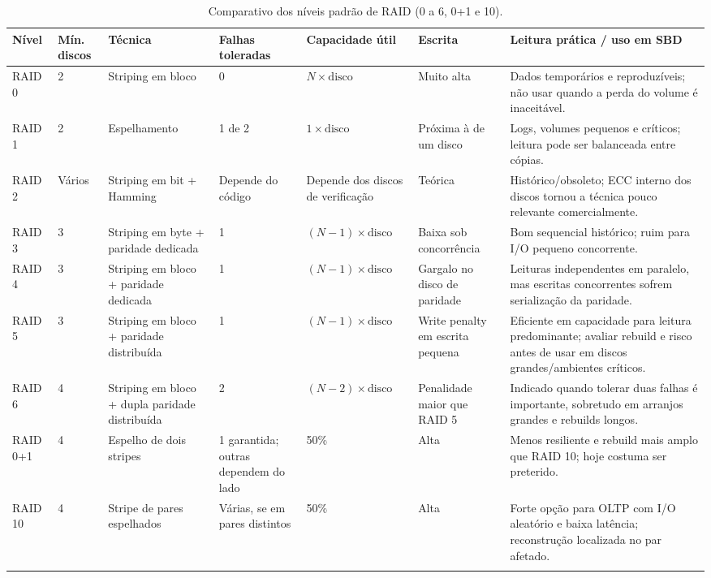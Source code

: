 \documentclass[11pt,a4paper]{article}
\begin{document}
\begin{landscape}
\begin{longtable}{@{}p{1.4cm}p{1.7cm}p{4.0cm}p{2.4cm}p{2.8cm}p{3.2cm}p{7.0cm}@{}}\toprule
\textbf{Nível} & \textbf{Mín. discos} & \textbf{Técnica} & \textbf{Falhas toleradas} & \textbf{Capacidade útil} & \textbf{Escrita} & \textbf{Leitura prática / uso em SBD}\\\midrule\endhead
RAID 0 & 2 & Striping em bloco & 0 & $N \times \text{disco}$ & Muito alta & Dados temporários e reproduzíveis; não usar quando a perda do volume é inaceitável.\\
RAID 1 & 2 & Espelhamento & 1 de 2 & $1 \times \text{disco}$ & Próxima à de um disco & Logs, volumes pequenos e críticos; leitura pode ser balanceada entre cópias.\\
RAID 2 & Vários & Striping em bit + Hamming & Depende do código & Depende dos discos de verificação & Teórica & Histórico/obsoleto; ECC interno dos discos tornou a técnica pouco relevante comercialmente.\\
RAID 3 & 3 & Striping em byte + paridade dedicada & 1 & $(N-1) \times \text{disco}$ & Baixa sob concorrência & Bom sequencial histórico; ruim para I/O pequeno concorrente.\\
RAID 4 & 3 & Striping em bloco + paridade dedicada & 1 & $(N-1) \times \text{disco}$ & Gargalo no disco de paridade & Leituras independentes em paralelo, mas escritas concorrentes sofrem serialização da paridade.\\
RAID 5 & 3 & Striping em bloco + paridade distribuída & 1 & $(N-1) \times \text{disco}$ & Write penalty em escrita pequena & Eficiente em capacidade para leitura predominante; avaliar rebuild e risco antes de usar em discos grandes/ambientes críticos.\\
RAID 6 & 4 & Striping em bloco + dupla paridade distribuída & 2 & $(N-2) \times \text{disco}$ & Penalidade maior que RAID 5 & Indicado quando tolerar duas falhas é importante, sobretudo em arranjos grandes e rebuilds longos.\\
RAID 0+1 & 4 & Espelho de dois stripes & 1 garantida; outras dependem do lado & 50\% & Alta & Menos resiliente e rebuild mais amplo que RAID 10; hoje costuma ser preterido.\\
RAID 10 & 4 & Stripe de pares espelhados & Várias, se em pares distintos & 50\% & Alta & Forte opção para OLTP com I/O aleatório e baixa latência; reconstrução localizada no par afetado.\\\bottomrule
\caption{Comparativo dos níveis padrão de RAID (0 a 6, 0+1 e 10).}\label{tab:raid-comparativo}
\end{longtable}
\end{landscape}
\end{document}
